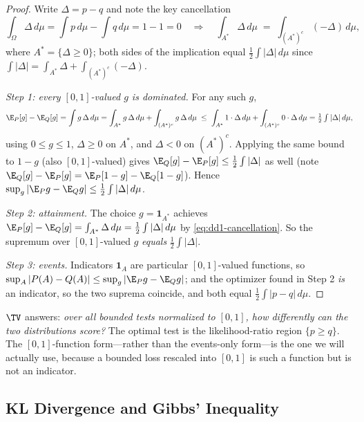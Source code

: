 \begin{proof}
Write $\Delta = p - q$ and note the key cancellation
\begin{equation}
\label{eq:dd1-cancellation}
\int_\Omega \Delta \, d\mu = \int p \, d\mu - \int q \, d\mu = 1 - 1 = 0
\quad\Longrightarrow\quad
\int_{A^*} \Delta \, d\mu \;=\; \int_{(A^*)^c} (-\Delta) \, d\mu ,
\end{equation}
where $A^* = \{\Delta \ge 0\}$; both sides of the implication equal
$\frac{1}{2}\int |\Delta| \, d\mu$ since
$\int |\Delta| = \int_{A^*} \Delta + \int_{(A^*)^c} (-\Delta)$.

\emph{Step 1: every $[0,1]$-valued $g$ is dominated.} For any such $g$,
\[
\E_P[g] - \E_Q[g] = \int g\, \Delta \, d\mu
= \int_{A^*} g\, \Delta \, d\mu + \int_{(A^*)^c} g\, \Delta \, d\mu
\;\le\; \int_{A^*} 1 \cdot \Delta \, d\mu + \int_{(A^*)^c} 0 \cdot \Delta \,
d\mu
= \tfrac{1}{2} \textstyle\int |\Delta| \, d\mu,
\]
using $0 \le g \le 1$, $\Delta \ge 0$ on $A^*$, and $\Delta < 0$ on
$(A^*)^c$. Applying the same bound to $1 - g$ (also $[0,1]$-valued) gives
$\E_Q[g] - \E_P[g] \le \frac{1}{2}\int|\Delta|$ as well (note
$\E_Q[g]-\E_P[g] = \E_P[1-g]-\E_Q[1-g]$). Hence
$\sup_g |\E_P g - \E_Q g| \le \frac{1}{2}\int |\Delta|\, d\mu$.

\emph{Step 2: attainment.} The choice $g = \mathbf{1}_{A^*}$ achieves
$\E_P[g] - \E_Q[g] = \int_{A^*} \Delta\, d\mu = \frac{1}{2}\int|\Delta|\,
d\mu$ by \eqref{eq:dd1-cancellation}. So the supremum over $[0,1]$-valued $g$
\emph{equals} $\frac{1}{2}\int |\Delta|$.

\emph{Step 3: events.} Indicators $\mathbf{1}_A$ are particular
$[0,1]$-valued functions, so
$\sup_A |P(A) - Q(A)| \le \sup_g |\E_P g - \E_Q g|$; and the optimizer found
in Step 2 \emph{is} an indicator, so the two suprema coincide, and both equal
$\frac{1}{2}\int|p - q|\,d\mu$.
\end{proof}

\begin{intuition}
$\TV$ answers: \emph{over all bounded tests normalized to $[0,1]$, how
differently can the two distributions score?} The optimal test is the
likelihood-ratio region $\{p \ge q\}$. The $[0,1]$-function form---rather
than the events-only form---is the one we will actually use, because a
bounded loss rescaled into $[0,1]$ is such a function but is not an
indicator.
\end{intuition}

\subsection{KL Divergence and Gibbs' Inequality}

